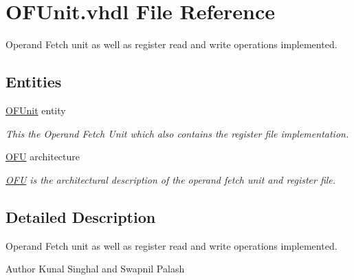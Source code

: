 \hypertarget{_o_f_unit_8vhdl}{\section{O\-F\-Unit.\-vhdl File Reference}
\label{_o_f_unit_8vhdl}
}


Operand Fetch unit as well as register read and write operations implemented.  


\subsection*{Entities}
\begin{DoxyCompactItemize}
\item 
\hyperlink{class_o_f_unit}{O\-F\-Unit} entity
\begin{DoxyCompactList}\small\item\em This the Operand Fetch Unit which also contains the register file implementation. \end{DoxyCompactList}\item 
\hyperlink{class_o_f_unit_1_1_o_f_u}{O\-F\-U} architecture
\begin{DoxyCompactList}\small\item\em \hyperlink{class_o_f_unit_1_1_o_f_u}{O\-F\-U} is the architectural description of the operand fetch unit and register file. \end{DoxyCompactList}\end{DoxyCompactItemize}


\subsection{Detailed Description}
Operand Fetch unit as well as register read and write operations implemented. \begin{DoxyAuthor}{Author}
Kunal Singhal and Swapnil Palash 
\end{DoxyAuthor}
